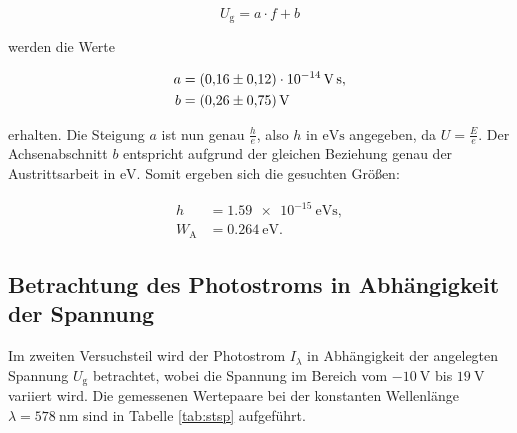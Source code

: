 \begin{equation*}
U_\text{g} = a\cdot f + b
\end{equation*}

werden die Werte

\begin{align*}
a &= \SI{0.16+-0.12e-14}{\volt\second},\\
b &= \SI{0.26+-0.75}{\volt}
\end{align*}

erhalten.
Die Steigung $a$ ist nun genau $\frac{h}{e}$, also $h$ in $\si{\eV\second}$ angegeben, da $U = \frac{E}{e}$. Der 
Achsenabschnitt $b$ entspricht aufgrund der gleichen Beziehung genau der Austrittsarbeit in $\si{\eV}$.
Somit ergeben sich die gesuchten Größen: 

\begin{align*}
h &= \SI{1.59e-15}{\eV\second},\\
W_\text{A} &= \SI{0.264}{\eV}.
\end{align*}

\subsection{Betrachtung des Photostroms in Abhängigkeit der Spannung}

Im zweiten Versuchsteil wird der Photostrom $I_\lambda$ in Abhängigkeit der angelegten Spannung $U_\text{g}$
betrachtet, wobei die Spannung im Bereich vom $\SI{-10}{\volt}$ bis $\SI{19}{\volt}$ variiert 
wird. Die gemessenen Wertepaare bei der konstanten Wellenlänge $\lambda = \SI{578}{\nano\meter}$
sind in Tabelle \ref{tab:stsp} aufgeführt. 

